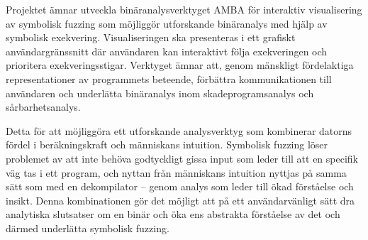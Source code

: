 
Projektet ämnar utveckla binäranalysverktyget AMBA för interaktiv visualisering
av symbolisk fuzzing som möjliggör utforskande binäranalys med hjälp av
symbolisk exekvering. Visualiseringen ska presenteras i ett grafiskt
användargränssnitt där användaren kan interaktivt följa exekveringen och
prioritera exekveringsstigar. Verktyget ämnar att, genom mänskligt fördelaktiga
representationer av programmets beteende, förbättra kommunikationen till
användaren och underlätta binäranalys inom skadeprogramsanalys och
sårbarhetsanalys.

Detta för att möjliggöra ett utforskande analysverktyg som kombinerar datorns
fördel i beräkningskraft och människans intuition. Symbolisk fuzzing
löser problemet av att inte behöva godtyckligt gissa input som leder till att
en specifik väg tas i ett program, och nyttan från människans intuition nyttjas
på samma sätt som med en dekompilator -- genom analys som leder till ökad
förståelse och insikt. Denna kombinationen gör det möjligt att på ett
användarvänligt sätt dra analytiska slutsatser om en binär och öka ens
abstrakta förståelse av det och därmed underlätta symbolisk fuzzing.

